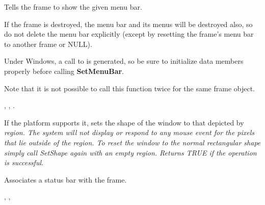 \label{wxframesetmenubar}


Tells the frame to show the given menu bar.




If the frame is destroyed, the
menu bar and its menus will be destroyed also, so do not delete the menu
bar explicitly (except by resetting the frame's menu bar to another
frame or NULL).

Under Windows, a call to  is generated, so be sure to initialize
data members properly before calling {\bf SetMenuBar}.

Note that it is not possible to call this function twice for the same frame object.


, , .

\label{wxframesetshape}


If the platform supports it, sets the shape of the window to that
depicted by \it{region}.  The system will not display or
respond to any mouse event for the pixels that lie outside of the
region.  To reset the window to the normal rectangular shape simply
call \it{SetShape} again with an empty region.  Returns TRUE if the
operation is successful.

\label{wxframesetstatusbar}


Associates a status bar with the frame.


, ,\rtfsp
{}

\label{wxframesetstatusbarpane}


